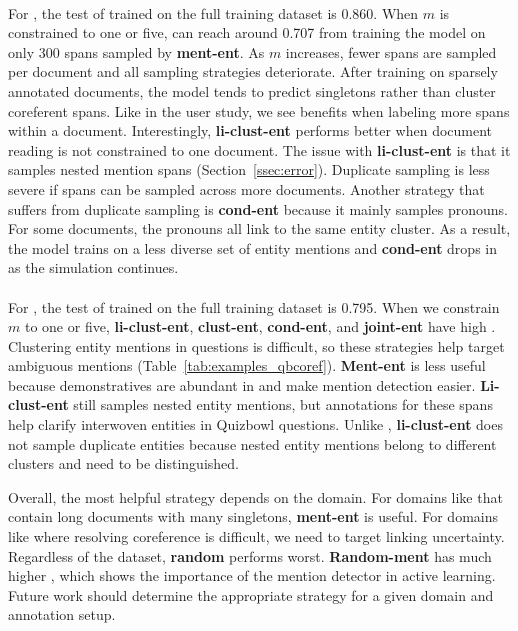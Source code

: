 \paragraph{\preco{}}
For \preco{}, the test \avgfone{} of
\icoref{} trained on the full training dataset is 0.860.
When $m$ is constrained to one or five, \avgfone{} can reach around 0.707 from
training the model on only 300 spans sampled by
\textbf{ment-ent}.
As $m$ increases, fewer spans are sampled per document and
all sampling strategies deteriorate.
After training on sparsely annotated documents, the model tends to predict
singletons rather than cluster coreferent spans.
Like in the user study, we see
benefits when labeling more spans within a document.
Interestingly, \textbf{li-clust-ent} performs better when document
reading is not constrained to one document.
The issue with
\textbf{li-clust-ent} is that it samples nested mention spans
(Section~\ref{ssec:error}).
Duplicate sampling is less severe if spans can be sampled across more
documents. Another strategy that suffers from duplicate sampling is
\textbf{cond-ent} because it mainly samples pronouns. For some documents, the
pronouns all link to the same entity cluster.
As a result, the model trains on a
less diverse set of entity mentions and \textbf{cond-ent} drops in
\avgfone{} as the simulation continues.

\paragraph{\qbcoref{}}
For \qbcoref{}, the
test \avgfone{} of \icoref{} trained on the full training dataset is 0.795.
When we constrain $m$ to one or five, \textbf{li-clust-ent}, \textbf{clust-ent}, \textbf{cond-ent}, and
\textbf{joint-ent} have high \avgfone{}. Clustering entity mentions in
\qbcoref{} questions is difficult, so these strategies
help target ambiguous mentions (Table~\ref{tab:examples_qbcoref}). \textbf{Ment-ent} is less useful
because demonstratives are abundant in \qbcoref{} and
make mention detection easier.
\textbf{Li-clust-ent} still
samples nested entity mentions, but annotations for these spans help clarify
interwoven entities in Quizbowl questions. Unlike \preco{},
\textbf{li-clust-ent} does not sample duplicate entities because nested entity
mentions belong to different clusters and need to be distinguished.


Overall, the most helpful strategy depends on the domain.
For domains like
\preco{} that contain long documents with many singletons, \textbf{ment-ent} is
useful.
For domains like \qbcoref{} where resolving coreference is difficult,
we need to target linking uncertainty.
Regardless of the dataset,
\textbf{random} performs worst.
\textbf{Random-ment} has much higher \avgfone{}, which shows the importance
of the mention detector in active learning.
Future work should
determine the appropriate strategy for a given domain and annotation
setup.

